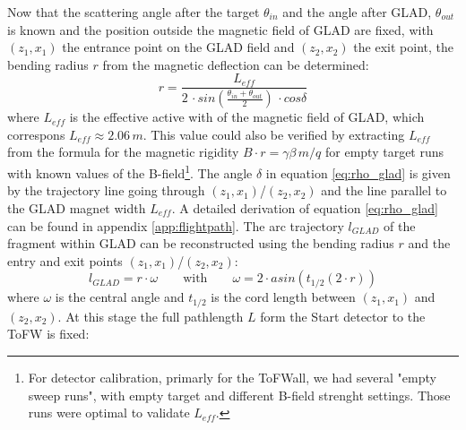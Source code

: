 Now that the scattering angle after the target $\theta_{in}$ and the angle after GLAD, $\theta_{out}$ is known and the position outside the magnetic field of GLAD are fixed, with $(z_1,x_1)$  the entrance point on the GLAD field and $(z_2,x_2)$ the exit point, the bending radius $r$ from the magnetic deflection can be determined:
\begin{equation}\label{eq:rho_glad}
r = \frac{L_{eff}}{2\,\cdot sin\left(\frac{\theta_{in}+\theta_{out}}{2}\right)\,\cdot cos\delta}
\end{equation}
where $L_{eff}$ is the effective active with of the magnetic field of GLAD, which correspons $L_{eff} \approx 2.06\,m$. This value could also be verified by extracting $L_{eff}$ from the formula for the magnetic rigidity $ B\cdot r = \gamma\beta \, m /q$ for empty target runs with known values of the B-field\footnote{For detector calibration, primarly for the ToFWall, we had several "empty sweep runs", with empty target and different B-field strenght settings. Those runs were optimal to validate $L_{eff}$.}.\newline
The angle $\delta$ in equation \ref{eq:rho_glad} is given by the trajectory line going through $(z_1,x_1)$/$(z_2,x_2)$ and the line parallel to the GLAD magnet width $L_{eff}$.\newline
A detailed derivation of equation \ref{eq:rho_glad} can be found in appendix \ref{app:flightpath}.
The arc trajectory $l_{GLAD}$ of the fragment within GLAD can be reconstructed using the bending radius $r$ and the entry and exit points $(z_1,x_1)$/$(z_2,x_2)$:
\begin{equation}\label{eq:arc}
l_{GLAD} = r \cdot \omega\qquad \text{with}\qquad \omega = 2\cdot asin(t_{1/2}{(2\cdot r)})
\end{equation}
where $\omega$ is the central angle and  $t_{1/2}$ is the cord length between $(z_1,x_1)$ and $(z_2,x_2)$.\newline
At this stage the full pathlength $L$ form the Start detector to the ToFW is fixed:
